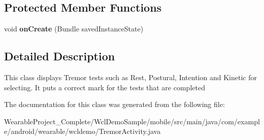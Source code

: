 \subsection*{Protected Member Functions}
\begin{DoxyCompactItemize}
\item 
void {\bfseries on\+Create} (Bundle saved\+Instance\+State)\hypertarget{classcom_1_1example_1_1android_1_1wearable_1_1wcldemo_1_1TremorActivity_ae09d71e1bafbcd4872b225b7ab23a538}{}\label{classcom_1_1example_1_1android_1_1wearable_1_1wcldemo_1_1TremorActivity_ae09d71e1bafbcd4872b225b7ab23a538}

\end{DoxyCompactItemize}


\subsection{Detailed Description}
This class displays Tremor tests such as Rest, Postural, Intention and Kinetic for selecting. It puts a correct mark for the tests that are completed 

The documentation for this class was generated from the following file\+:\begin{DoxyCompactItemize}
\item 
Wearable\+Project\+\_\+\+Complete/\+Wcl\+Demo\+Sample/mobile/src/main/java/com/example/android/wearable/wcldemo/Tremor\+Activity.\+java\end{DoxyCompactItemize}
